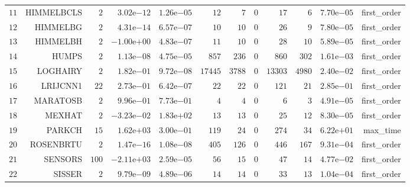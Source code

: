 \begin{longtable}{rrrrrrrrrrrr}
  \(    11\) & HIMMELBCLS & \(     2\) & \( 3.02\)e\(-12\) & \( 1.26\)e\(-05\) & \(    12\) & \(     7\) & \(     0\) & \(    17\) & \(     6\) & \( 7.70\)e\(-05\) & first\_order \\
  \(    12\) & HIMMELBG & \(     2\) & \( 4.31\)e\(-14\) & \( 6.57\)e\(-07\) & \(    10\) & \(    10\) & \(     0\) & \(    26\) & \(     9\) & \( 7.80\)e\(-05\) & first\_order \\
  \(    13\) & HIMMELBH & \(     2\) & \(-1.00\)e\(+00\) & \( 4.83\)e\(-07\) & \(    11\) & \(    10\) & \(     0\) & \(    28\) & \(    10\) & \( 5.89\)e\(-05\) & first\_order \\
  \(    14\) & HUMPS & \(     2\) & \( 1.13\)e\(-08\) & \( 4.75\)e\(-05\) & \(   857\) & \(   236\) & \(     0\) & \(   860\) & \(   302\) & \( 1.61\)e\(-03\) & first\_order \\
  \(    15\) & LOGHAIRY & \(     2\) & \( 1.82\)e\(-01\) & \( 9.72\)e\(-08\) & \( 17445\) & \(  3788\) & \(     0\) & \( 13303\) & \(  4980\) & \( 2.40\)e\(-02\) & first\_order \\
  \(    16\) & LRIJCNN1 & \(    22\) & \( 2.73\)e\(-01\) & \( 6.42\)e\(-07\) & \(    22\) & \(    22\) & \(     0\) & \(   121\) & \(    21\) & \( 2.85\)e\(-01\) & first\_order \\
  \(    17\) & MARATOSB & \(     2\) & \( 9.96\)e\(-01\) & \( 7.73\)e\(-01\) & \(     4\) & \(     4\) & \(     0\) & \(     6\) & \(     3\) & \( 4.91\)e\(-05\) & first\_order \\
  \(    18\) & MEXHAT & \(     2\) & \(-3.23\)e\(-02\) & \( 1.83\)e\(+02\) & \(    13\) & \(    13\) & \(     0\) & \(    25\) & \(    12\) & \( 8.30\)e\(-05\) & first\_order \\
  \(    19\) & PARKCH & \(    15\) & \( 1.62\)e\(+03\) & \( 3.00\)e\(-01\) & \(   119\) & \(    24\) & \(     0\) & \(   274\) & \(    34\) & \( 6.22\)e\(+01\) & max\_time \\
  \(    20\) & ROSENBRTU & \(     2\) & \( 1.47\)e\(-16\) & \( 1.08\)e\(-08\) & \(   405\) & \(   126\) & \(     0\) & \(   446\) & \(   167\) & \( 9.31\)e\(-04\) & first\_order \\
  \(    21\) & SENSORS & \(   100\) & \(-2.11\)e\(+03\) & \( 2.59\)e\(-05\) & \(    56\) & \(    15\) & \(     0\) & \(    47\) & \(    14\) & \( 4.77\)e\(-02\) & first\_order \\
  \(    22\) & SISSER & \(     2\) & \( 9.79\)e\(-09\) & \( 4.89\)e\(-06\) & \(    14\) & \(    14\) & \(     0\) & \(    33\) & \(    13\) & \( 1.04\)e\(-04\) & first\_order \\

\end{longtable}
